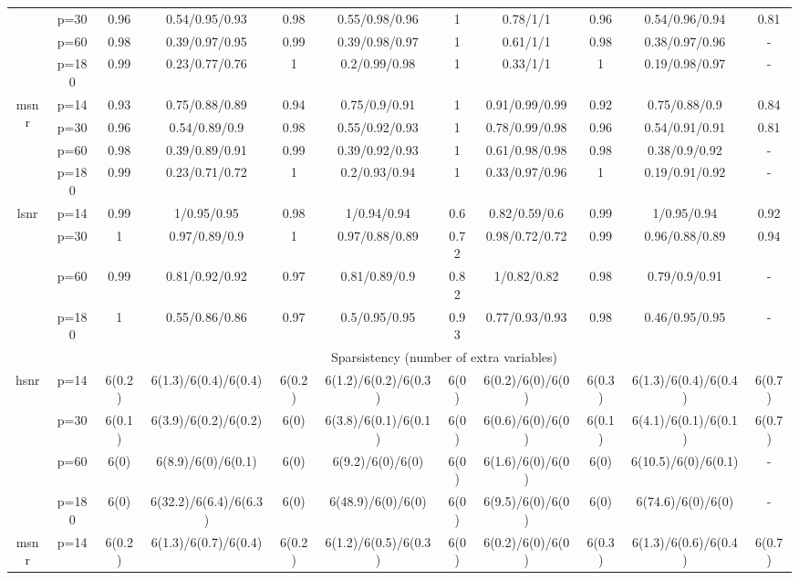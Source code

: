 \begin{table}[ht]
{\begin{tabular}{|c|c|cc|cc|cc|cc|c|}
   & p=30 & 0.96 & 0.54/0.95/0.93 & 0.98 & 0.55/0.98/0.96 & 1 & 0.78/1/1 & 0.96 & 0.54/0.96/0.94 & 0.81 \\ 
   & p=60 & 0.98 & 0.39/0.97/0.95 & 0.99 & 0.39/0.98/0.97 & 1 & 0.61/1/1 & 0.98 & 0.38/0.97/0.96 & - \\ 
   & p=180 & 0.99 & 0.23/0.77/0.76 & 1 & 0.2/0.99/0.98 & 1 & 0.33/1/1 & 1 & 0.19/0.98/0.97 & - \\ 
  \midrule\multirow{4}[2]{*}{msnr} & p=14 & 0.93 & 0.75/0.88/0.89 & 0.94 & 0.75/0.9/0.91 & 1 & 0.91/0.99/0.99 & 0.92 & 0.75/0.88/0.9 & 0.84 \\ 
   & p=30 & 0.96 & 0.54/0.89/0.9 & 0.98 & 0.55/0.92/0.93 & 1 & 0.78/0.99/0.98 & 0.96 & 0.54/0.91/0.91 & 0.81 \\ 
   & p=60 & 0.98 & 0.39/0.89/0.91 & 0.99 & 0.39/0.92/0.93 & 1 & 0.61/0.98/0.98 & 0.98 & 0.38/0.9/0.92 & - \\ 
   & p=180 & 0.99 & 0.23/0.71/0.72 & 1 & 0.2/0.93/0.94 & 1 & 0.33/0.97/0.96 & 1 & 0.19/0.91/0.92 & - \\ 
  \midrule\multirow{4}[2]{*}{lsnr} & p=14 & 0.99 & 1/0.95/0.95 & 0.98 & 1/0.94/0.94 & 0.6 & 0.82/0.59/0.6 & 0.99 & 1/0.95/0.94 & 0.92 \\ 
   & p=30 & 1 & 0.97/0.89/0.9 & 1 & 0.97/0.88/0.89 & 0.72 & 0.98/0.72/0.72 & 0.99 & 0.96/0.88/0.89 & 0.94 \\ 
   & p=60 & 0.99 & 0.81/0.92/0.92 & 0.97 & 0.81/0.89/0.9 & 0.82 & 1/0.82/0.82 & 0.98 & 0.79/0.9/0.91 & - \\ 
   & p=180 & 1 & 0.55/0.86/0.86 & 0.97 & 0.5/0.95/0.95 & 0.93 & 0.77/0.93/0.93 & 0.98 & 0.46/0.95/0.95 & - \\ 
   \midrule 
 \multicolumn{1}{|c}{} &       & \multicolumn{9}{c|}{Sparsistency (number of extra variables)} \\
\midrule\multirow{4}[2]{*}{hsnr} & p=14 & 6(0.2) & 6(1.3)/6(0.4)/6(0.4) & 6(0.2) & 6(1.2)/6(0.2)/6(0.3) & 6(0) & 6(0.2)/6(0)/6(0) & 6(0.3) & 6(1.3)/6(0.4)/6(0.4) & 6(0.7) \\ 
   & p=30 & 6(0.1) & 6(3.9)/6(0.2)/6(0.2) & 6(0) & 6(3.8)/6(0.1)/6(0.1) & 6(0) & 6(0.6)/6(0)/6(0) & 6(0.1) & 6(4.1)/6(0.1)/6(0.1) & 6(0.7) \\ 
   & p=60 & 6(0) & 6(8.9)/6(0)/6(0.1) & 6(0) & 6(9.2)/6(0)/6(0) & 6(0) & 6(1.6)/6(0)/6(0) & 6(0) & 6(10.5)/6(0)/6(0.1) & - \\ 
   & p=180 & 6(0) & 6(32.2)/6(6.4)/6(6.3) & 6(0) & 6(48.9)/6(0)/6(0) & 6(0) & 6(9.5)/6(0)/6(0) & 6(0) & 6(74.6)/6(0)/6(0) & - \\ 
  \midrule\multirow{4}[2]{*}{msnr} & p=14 & 6(0.2) & 6(1.3)/6(0.7)/6(0.4) & 6(0.2) & 6(1.2)/6(0.5)/6(0.3) & 6(0) & 6(0.2)/6(0)/6(0) & 6(0.3) & 6(1.3)/6(0.6)/6(0.4) & 6(0.7) \\ 

\end{tabular}}
\end{table}
